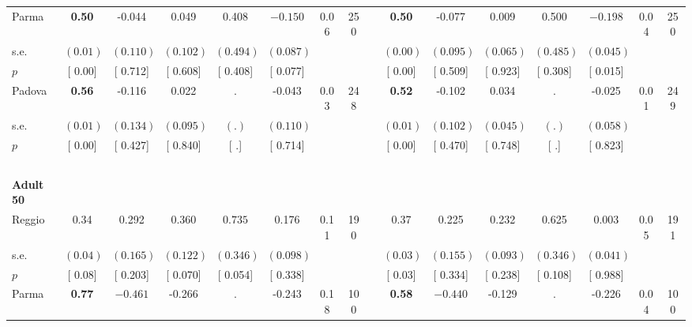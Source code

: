 \begin{longtable}{L{8em} c c c c c c c p{1em} c c c c c c c}
\quad \quad \quad Parma& \textbf{     0.50} &    -0.044 &     0.049 &     0.408 & $ \mathbf{   -0.150}$ &      0.06 &       250 & & \textbf{     0.50} &    -0.077 &     0.009 &     0.500 & $ \mathbf{   -0.198}$ &      0.04 &       250  \\*
\quad \quad \quad \quad s.e.& $ (     0.01)$ & $ (    0.110)$ & $ (    0.102)$ & $ (    0.494)$ & $ (    0.087)$ & & & & $ (     0.00)$ & $ (    0.095)$ & $ (    0.065)$ & $ (    0.485)$ & $ (    0.045)$ & &  \\*
\quad \quad \quad \quad $ p$ & [     0.00] & [    0.712] & [    0.608] & [    0.408] & [    0.077] & & & & [     0.00] & [    0.509] & [    0.923] & [    0.308] & [    0.015] & &  \\[1em]
\quad \quad \quad Padova& \textbf{     0.56} &    -0.116 &     0.022 &         . &    -0.043 &      0.03 &       248 & & \textbf{     0.52} &    -0.102 &     0.034 &         . &    -0.025 &      0.01 &       249  \\*
\quad \quad \quad \quad s.e.& $ (     0.01)$ & $ (    0.134)$ & $ (    0.095)$ & $ (        .)$ & $ (    0.110)$ & & & & $ (     0.01)$ & $ (    0.102)$ & $ (    0.045)$ & $ (        .)$ & $ (    0.058)$ & &  \\*
\quad \quad \quad \quad $ p$ & [     0.00] & [    0.427] & [    0.840] & [        .] & [    0.714] & & & & [     0.00] & [    0.470] & [    0.748] & [        .] & [    0.823] & &  \\[1em]
~\\[1em]
\quad \quad \textbf{Adult 50} & & & & & & & & & & & & & & & \\* 
\quad \quad \quad Reggio& 0.34 &     0.292 & $ \mathbf{    0.360}$ & $ \mathbf{    0.735}$ &     0.176 &      0.11 &       190 & & 0.37 &     0.225 &     0.232 &     0.625 &     0.003 &      0.05 &       191  \\*
\quad \quad \quad \quad s.e.& $ (     0.04)$ & $ (    0.165)$ & $ (    0.122)$ & $ (    0.346)$ & $ (    0.098)$ & & & & $ (     0.03)$ & $ (    0.155)$ & $ (    0.093)$ & $ (    0.346)$ & $ (    0.041)$ & &  \\*
\quad \quad \quad \quad $ p$ & [     0.08] & [    0.203] & [    0.070] & [    0.054] & [    0.338] & & & & [     0.03] & [    0.334] & [    0.238] & [    0.108] & [    0.988] & &  \\[1em]
\quad \quad \quad Parma& \textbf{     0.77} & $ \mathbf{   -0.461}$ &    -0.266 &         . &    -0.243 &      0.18 &       100 & & \textbf{     0.58} & $ \mathbf{   -0.440}$ &    -0.129 &         . &    -0.226 &      0.04 &       100  \\*

\end{longtable}
